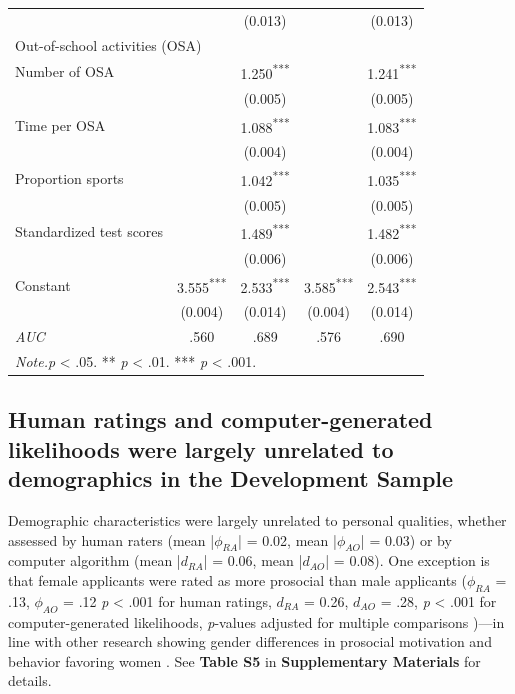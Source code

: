 \documentclass[11pt]{report}
\begin{document}
\begin{mainf}
\begin{table}[!htbp]
\begin{tabular}{@{\extracolsep{3pt}}lcccc}
&  & (0.013) &  & (0.013) \\
\multicolumn{5}{l}{Out-of-school activities (OSA)} \\
\hspace{1em}Number of OSA &  & 1.250\textsuperscript{***} &  & 1.241\textsuperscript{***} \\
&  & (0.005) &  & (0.005) \\
\hspace{1em}Time per OSA &  & 1.088\textsuperscript{***} &  & 1.083\textsuperscript{***} \\
&  & (0.004) &  & (0.004) \\
\hspace{1em}Proportion sports &  & 1.042\textsuperscript{***} &  & 1.035\textsuperscript{***} \\
&  & (0.005) &  & (0.005) \\
Standardized test scores &  & 1.489\textsuperscript{***} &  & 1.482\textsuperscript{***} \\
&  & (0.006) &  & (0.006) \\
Constant & 3.555\textsuperscript{***} & 2.533\textsuperscript{***} & 3.585\textsuperscript{***} & 2.543\textsuperscript{***} \\
& (0.004) & (0.014) & (0.004) & (0.014) \\
\hline
\textit{AUC} & .560 & .689 & .576 & .690 \\
\hline
\multicolumn{5}{l}{\textit{Note.}\enspace * \textit{p} < .05.\; ** \textit{p} < .01.\; *** \textit{p} < .001.} \\
\end{tabular}
\end{table}

\subsection{Human ratings and computer-generated likelihoods were largely unrelated to demographics in the Development Sample}
Demographic characteristics were largely unrelated to personal qualities, whether assessed by human raters (mean |$\phi_{RA}$| = 0.02, mean |$\phi_{AO}$| = 0.03) or by computer algorithm (mean |$d_{RA}$| = 0.06, mean |$d_{AO}$| = 0.08). One exception is that female applicants were rated as more prosocial than male applicants ($\phi_{RA}$ = .13, $\phi_{AO}$ = .12 \textit{p} < .001 for human ratings, $d_{RA}$ = 0.26, $d_{AO}$ = .28, \textit{p} < .001 for computer-generated likelihoods, \textit{p}-values adjusted for multiple comparisons \cite{benjamini_control_2001})—in line with other research showing gender differences in prosocial motivation and behavior favoring women \cite{kamas_empathy_2021}. See \textbf{Table S5} in \textbf{Supplementary Materials} for details. 


\end{mainf}
\end{document}
